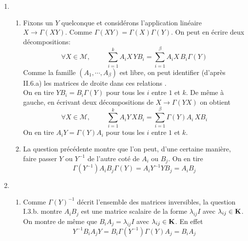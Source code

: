 \begin{enumerate}
\item
\begin{enumerate}
\item Fixons un $Y$ quelconque et consid\'{e}rons l'application lin\'{e}aire $X \rightarrow \Gamma (XY)$. Comme $\Gamma (XY)=\Gamma (X)\Gamma (Y)$. On peut en \'{e}crire deux d\'{e}compositions: 
\begin{displaymath}
\forall X\in \mathcal M,\hspace{1cm}\sum_{i=1}^{k }A_{i}X\,YB_{i}=\sum_{i=1}^{\beta }A_{i}X\,B_{i}\Gamma (Y) 
\end{displaymath}
Comme la famille $(A_{1},\cdots ,A_{\beta })$ est libre, on peut identifier (d'apr\`{e}s II.6.a) les matrices de droite dans ces relations .\\
On en tire $YB_{i}=B_{i}\Gamma (Y)$ pour tous les $i$ entre $1$ et $k$.\newline
 De m\^{e}me à gauche, en \'{e}crivant deux d\'{e}compositions de $X\rightarrow\Gamma (YX)$ on obtient 
\begin{displaymath}
\forall X\in \mathcal M,\hspace{1cm}\sum_{i=1}^{k }A_{i}Y\,XB_{i}=\sum_{i=1}^{\beta }\Gamma (Y)A_{i}\,XB_{i}  
\end{displaymath}
 On en tire $A_{i}Y=\Gamma (Y)A_{i}$ pour tous les $i$ entre $1$ et $k$.
 \item  La question pr\'{e}c\'{e}dente montre que l'on peut, d'une certaine mani\`{e}re, faire passer $Y$ ou $Y^{-1}$ de l'autre cot\'{e} de $A_{i}$ ou $B_{j}$. On en tire
\begin{displaymath}
\Gamma (Y^{-1})A_{i}B_{j}\Gamma (Y)=A_{i}Y^{-1}YB_{j}=A_{i}B_{j}  
\end{displaymath}
\end{enumerate}

\item 
\begin{enumerate}
 \item  Comme $\Gamma (Y)^{-1}$ d\'{e}crit l'ensemble des matrices inversibles, la question I.3.b. montre $A_{i}B_{j}$ est une matrice scalaire de la forme $\lambda_{ij}I$ avec $\lambda _{ij}\in \mathbf{K}$.\newline
On montre de m\^{e}me que $B_{i}A_{j}=\lambda _{ij}I$ avec $\lambda _{ij}\in \mathbf{K}$. En effet 
\begin{displaymath}
Y^{-1}B_{i}A_{j}Y=B_{i}\Gamma (Y^{-1})\Gamma (Y)A_{j}=B_{i}A_{j}  
\end{displaymath}


\end{enumerate}
\end{enumerate}
